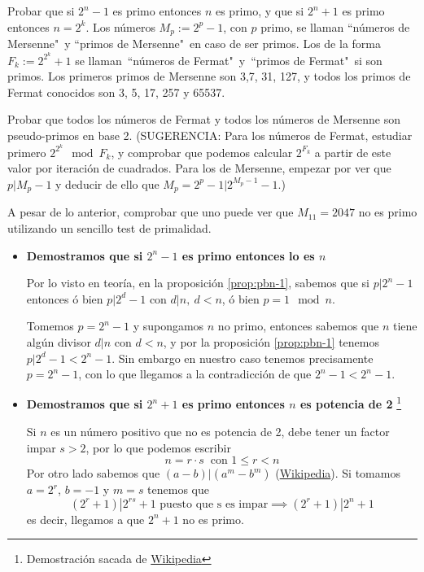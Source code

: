 \begin{problem}[10]
\ppart Probar que si $2^n-1$ es primo entonces $n$ es primo, y que si
$2^n+1$
 es primo entonces $n=2^k$. Los números $M_p:=2^p-1$, con $p$ primo, se
llaman ``números de Mersenne"\ y ``primos de Mersenne"\ en caso de
ser primos. Los de la forma $F_k:=2^{2^k}+1$ se llaman\ ``números
de Fermat"\ y\ ``primos de Fermat"\ si son primos. Los primeros
primos de Mersenne son 3,7, 31, 127, y todos los primos de Fermat
conocidos son 3, 5, 17, 257 y 65537.

\ppart Probar que todos los números de Fermat y todos los números de
Mersenne son pseudo-primos en base 2. (SUGERENCIA: Para los
números de Fermat, estudiar primero $2^{2^k} \mod F_k$, y
comprobar que podemos calcular $2^{F_k}$ a partir de este valor
por iteración de cuadrados. Para los de Mersenne, empezar por ver
que $p\vert M_p-1$ y deducir de ello que $M_p= 2^p-1\vert
2^{M_p-1}-1$.)

\ppart A pesar de lo anterior, comprobar que uno puede ver que $M_{11}=2047$ no es
primo utilizando un sencillo test de primalidad.

\solution


\spart
\begin{itemize}
\item \textbf{Demostramos que si $2^n-1$ es primo entonces lo es $n$}


Por lo visto en teoría, en la proposición \ref{prop:pbn-1}, sabemos que si $p|2^n-1$ entonces ó bien $p|2^d-1$  con $d|n,\ d<n$, ó bien $p=1 \mod n$.

Tomemos $p=2^n-1$ y supongamos $n$ no primo, entonces sabemos que $n$ tiene algún divisor $d|n$ con $d<n$, y por la proposición \ref{prop:pbn-1} tenemos $p|2^d-1 < 2^n-1$. Sin embargo en nuestro caso tenemos precisamente $p=2^n-1$, con lo que llegamos a la contradicción de que $2^n-1< 2^n-1$.


\item \textbf{Demostramos que si $2^n+1$ es primo entonces $n$ es potencia de 2}
\footnote{Demostración sacada de \href{https://en.wikipedia.org/wiki/Fermat_number\#Other_theorems_about_Fermat_numbers}{Wikipedia}}

Si $n$ es un número positivo que no es potencia de 2, debe tener un factor impar $s>2$, por lo que podemos escribir
\[n = r\cdot s \ \text{ con } 1 \leq r < n\]
Por otro lado sabemos que $(a-b)|(a^m-b^m)$ (\href{https://en.wikipedia.org/wiki/Fermat_number\#Other_theorems_about_Fermat_numbers}{Wikipedia}). Si tomamos $a=2^r$, $b=-1$ y $m=s$ tenemos que
\[(2^r+1)|2^{rs}+1 \text{ puesto que s es impar} \implies (2^r+1)|2^n+1\]
es decir, llegamos a que $2^n + 1$ no es primo.


\end{itemize}
\end{problem}
